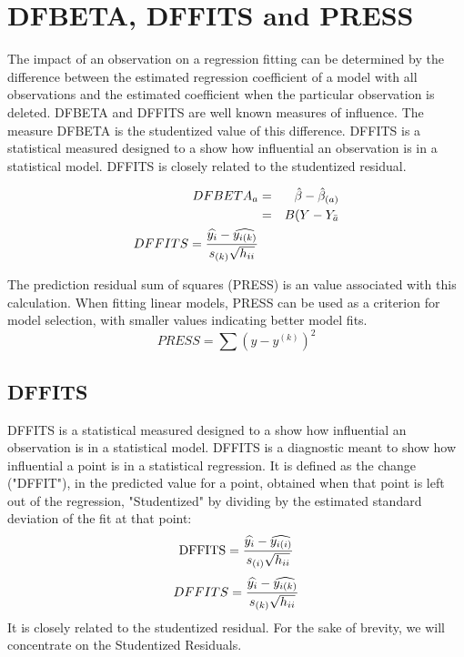 \documentclass[12pt, a4paper]{report}
\theoremstyle{plain}
\theoremstyle{definition}
\theoremstyle{remark}
\begin{document}
\section{DFBETA, DFFITS and PRESS}

The impact of an observation on a regression fitting can be determined by the difference between the estimated regression coefficient of a model with all observations and the estimated coefficient when the particular observation is deleted. DFBETA and DFFITS are well known measures of influence. The measure DFBETA is the studentized value of this difference. DFFITS is a statistical measured designed to a show how influential an observation is in a statistical model. DFFITS is closely related to the studentized residual.

\begin{eqnarray}
DFBETA_{a} &=& \hat{\beta} - \hat{\beta}_{(a)} \\
&=& B(Y-Y_{\bar{a}}
\\ DFFITS = {\widehat{y_i} -
	\widehat{y_{i(k)}} \over s_{(k)} \sqrt{h_{ii}}} 
\end{eqnarray}

The prediction residual sum of squares (PRESS) is an value associated with this calculation. When fitting linear models, PRESS can be used as a criterion for model selection, with smaller values indicating better model fits.
\begin{displaymath}
PRESS = \sum(y-y^{(k)})^2
\end{displaymath}
%	
%	


\subsection{DFFITS} %
DFFITS is a statistical measured designed to a show how influential an observation is in a statistical model. DFFITS is a diagnostic meant to show how influential a point is in a statistical regression. It is defined as the change ("DFFIT"), in the predicted value for a point, obtained when that point is left out of the regression, "Studentized" by dividing by the estimated standard deviation of the fit at that point:
\[ \mbox{DFFITS} = {\widehat{y_i} - \widehat{y_{i(i)}} \over s_{(i)} \sqrt{h_{ii}}}\]
\begin{displaymath} DFFITS = {\widehat{y_i} -
	\widehat{y_{i(k)}} \over s_{(k)} \sqrt{h_{ii}}} \end{displaymath}
It is closely related to the studentized residual. For the sake of brevity, we will concentrate on the Studentized Residuals.
\end{document}

